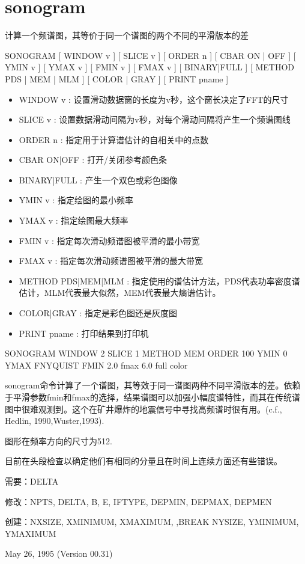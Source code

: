 \section{sonogram}
\label{cmd:sonogram}

计算一个频谱图，其等价于同一个谱图的两个不同的平滑版本的差

SONOGRAM [ WINDOW v ] [ SLICE v ] [ ORDER n ] [ CBAR ON | OFF ] [ YMIN v ] [ YMAX v ] [ FMIN v ] [ FMAX v ] [ BINARY|FULL ] [ METHOD PDS | MEM | MLM ] [ COLOR | GRAY ] [ PRINT pname ]

\begin{itemize}
\item WINDOW v : 设置滑动数据窗的长度为v秒，这个窗长决定了FFT的尺寸 
\item SLICE v : 设置数据滑动间隔为v秒，对每个滑动间隔将产生一个频谱图线 
\item ORDER n : 指定用于计算谱估计的自相关中的点数 
\item CBAR {ON|OFF} : 打开/关闭参考颜色条 
\item BINARY|FULL : 产生一个双色或彩色图像 
\item YMIN v : 指定绘图的最小频率  
\item YMAX v : 指定绘图最大频率 
\item FMIN v : 指定每次滑动频谱图被平滑的最小带宽 
\item FMAX v : 指定每次滑动频谱图被平滑的最大带宽  
\item METHOD {PDS|MEM|MLM} : 指定使用的谱估计方法，PDS代表功率密度谱估计，MLM代表最大似然，MEM代表最大熵谱估计。 
\item COLOR|GRAY : 指定是彩色图还是灰度图 
\item PRINT pname : 打印结果到打印机 
\end{itemize}
 
SONOGRAM WINDOW 2 SLICE 1 METHOD MEM ORDER 100 YMIN 0 YMAX 	FNYQUIST FMIN 2.0 fmax 6.0 full color

sonogram命令计算了一个谱图，其等效于同一谱图两种不同平滑版本的差。依赖于平滑参数fmin和fmax的选择，结果谱图可以加强小幅度谱特性，而其在传统谱图中很难观测到。这个在矿井爆炸的地震信号中寻找高频谱时很有用。(c.f., Hedlin, 1990,Wuster,1993).

图形在频率方向的尺寸为512.

目前在头段检查以确定他们有相同的分量且在时间上连续方面还有些错误。

需要：DELTA

修改：NPTS, DELTA, B, E, IFTYPE, DEPMIN, DEPMAX, DEPMEN

创建：NXSIZE, XMINIMUM, XMAXIMUM, ,BREAK NYSIZE, YMINIMUM, YMAXIMUM

May 26, 1995 (Version 00.31)
